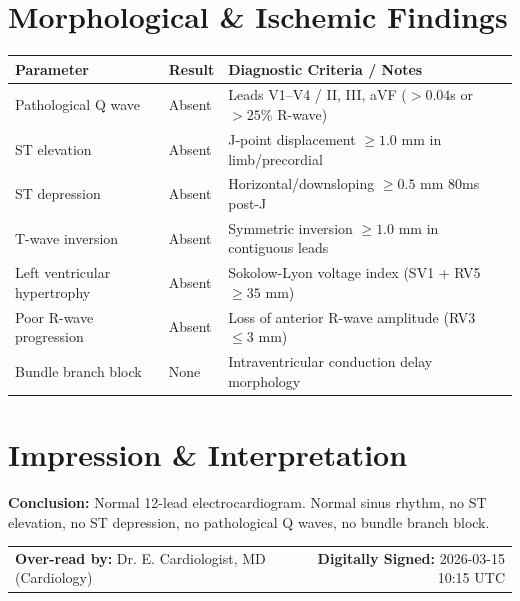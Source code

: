 \documentclass[10pt,a4paper]{article}
\begin{document}
\section*{Morphological \& Ischemic Findings}

\begin{tabular}{@{} p{6.8cm} p{2.8cm} p{5.5cm} @{}}
  \toprule
  \textbf{Parameter} & \textbf{Result} & \textbf{Diagnostic Criteria / Notes} \\
  \midrule
  Pathological Q wave & Absent & Leads V1--V4 / II, III, aVF ($>0.04$s or $>25$\% R-wave) \\
  ST elevation & Absent & J-point displacement $\ge 1.0$ mm in limb/precordial \\
  ST depression & Absent & Horizontal/downsloping $\ge 0.5$ mm 80ms post-J \\
  T-wave inversion & Absent & Symmetric inversion $\ge 1.0$ mm in contiguous leads \\
  Left ventricular hypertrophy & Absent & Sokolow-Lyon voltage index (SV1 + RV5 $\ge 35$ mm) \\
  Poor R-wave progression & Absent & Loss of anterior R-wave amplitude (RV3 $\le 3$ mm) \\
  Bundle branch block & None & Intraventricular conduction delay morphology \\
  \bottomrule
\end{tabular}

\vspace{12pt}

\section*{Impression \& Interpretation}

\noindent
\textbf{Conclusion:} Normal 12-lead electrocardiogram. Normal sinus rhythm, no ST elevation, no ST depression, no pathological Q waves, no bundle branch block.

\vspace{18pt}

\noindent
\begin{tabular*}{\textwidth}{@{} l @{\extracolsep{\fill}} r @{}}
  \textbf{Over-read by:} Dr. E. Cardiologist, MD (Cardiology) & \textbf{Digitally Signed:} 2026-03-15 10:15 UTC \\
\end{tabular*}
\end{document}
